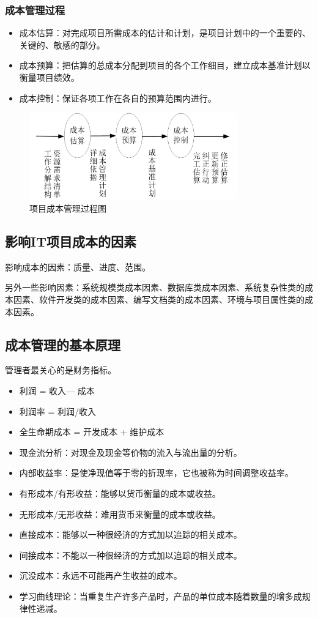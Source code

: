 \subsubsection{成本管理过程}
\begin{itemize}
	\item 成本估算：对完成项目所需成本的估计和计划，是项目计划中的一个重要的、关键的、敏感的部分。
	\item 成本预算：把估算的总成本分配到项目的各个工作细目，建立成本基准计划以衡量项目绩效。
	\item 成本控制：保证各项工作在各自的预算范围内进行。
\end{itemize}
\begin{figure}[!h]
	\centering
	\includegraphics[width=0.8\textwidth]{image/6-1}
	\caption{项目成本管理过程图}
\end{figure}
\subsection{影响IT项目成本的因素}
影响成本的因素：质量、进度、范围。
\par 另外一些影响因素：系统规模类成本因素、数据库类成本因素、系统复杂性类的成本因素、软件开发类的成本因素、编写文档类的成本因素、环境与项目属性类的成本因素。
\subsection{成本管理的基本原理}
管理者最关心的是财务指标。
\begin{itemize}
	\item 利润 = 收入— 成本 
	\item 利润率 = 利润/收入
	\item 全生命期成本 = 开发成本 + 维护成本
	\item 现金流分析：对现金及现金等价物的流入与流出量的分析。
	\item 内部收益率：是使净现值等于零的折现率，它也被称为时间调整收益率。
	\item 有形成本/有形收益：能够以货币衡量的成本或收益。 
	\item 无形成本/无形收益：难用货币来衡量的成本或收益。
	\item 直接成本：能够以一种很经济的方式加以追踪的相关成本。
	\item 间接成本：不能以一种很经济的方式加以追踪的相关成本。
	\item 沉没成本：永远不可能再产生收益的成本。
	\item 学习曲线理论：当重复生产许多产品时，产品的单位成本随着数量的增多成规律性递减。 
\end{itemize}
